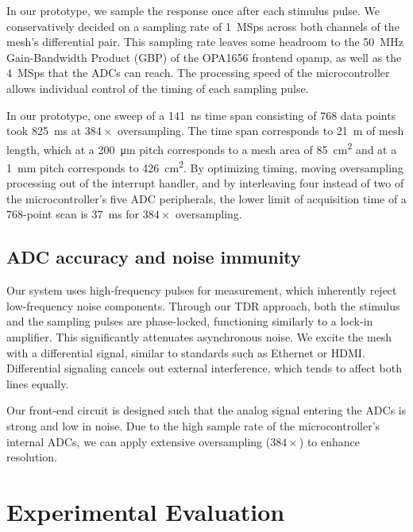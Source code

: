 \documentclass[final]{iacrtrans}
\newcommand{\partno}[1]{\textsf{\small#1}}
\begin{document}
In our prototype, we sample the response once after each stimulus pulse. We conservatively decided on a sampling rate of
\qty{1}{MSps} across both channels of the mesh's differential pair. This sampling rate leaves some headroom to the
\qty{50}{\mega\hertz} Gain-Bandwidth Product (GBP) of the \partno{OPA1656} frontend opamp, as well as the \qty{4}{MSps}
that the ADCs can reach. The processing speed of the microcontroller allows individual control of the timing of each
sampling pulse.

In our prototype, one sweep of a \qty{141}{\nano\second} time span consisting of $768$ data points took
\qty{825}{\milli\second} at $384\times$ oversampling. The time span corresponds to \qty{21}{\meter} of mesh length,
which at a \qty{200}{\micro\meter} pitch corresponds to a mesh area of \qty{85}{\centi\meter\squared} and at a
\qty{1}{\milli\meter} pitch corresponds to \qty{426}{\centi\meter\squared}. By optimizing timing, moving oversampling
processing out of the interrupt handler, and by interleaving four instead of two of the microcontroller's five ADC
peripherals, the lower limit of acquisition time of a $768$-point scan is \qty{37}{\milli\second} for $384\times$
oversampling.

\subsection{ADC accuracy and noise immunity}

Our system uses high-frequency pulses for measurement, which inherently reject low-frequency noise components. Through
our TDR approach, both the stimulus and the sampling pulses are phase-locked, functioning similarly to a lock-in
amplifier. This significantly attenuates asynchronous noise. We excite the mesh with a differential signal, similar to
standards such as Ethernet or HDMI. Differential signaling cancels out external interference, which tends to affect both
lines equally\cite{bogatinSignalPowerIntegrity2018}.

Our front-end circuit is designed such that the analog signal entering the ADCs is strong and low in noise. Due to the
high sample rate of the microcontroller's internal ADCs, we can apply extensive oversampling ($384\times$) to enhance
resolution.

\section{Experimental Evaluation}
\end{document}
